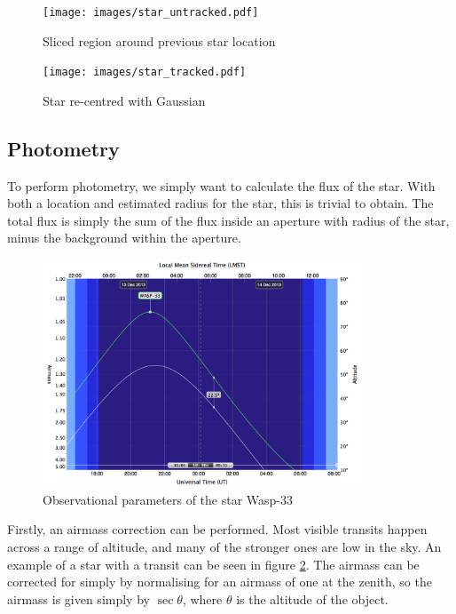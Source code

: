 \begin{figure}[ht]
    \centering
    \begin{minipage}[b]{\figwidth}
        \centering
        \texttt{[image: images/star\_untracked.pdf]}
        \caption{Sliced region around previous star location}
        \label{fig:untracked_star}
    \end{minipage}\quad\quad
    \begin{minipage}[b]{\figwidth}
        \texttt{[image: images/star\_tracked.pdf]}
        \caption{Star re-centred with Gaussian}
        \label{fig:tracked_Star}
    \end{minipage}
\end{figure}
\subsection{Photometry}

To perform photometry, we simply want to calculate the flux of the star. With both a location and estimated radius for the star, this is trivial to obtain. The total flux is simply the sum of the flux inside an aperture with radius of the star, minus the background within the aperture.

\begin{figure}[ht]
    \centering
    \includegraphics[width=0.85\textwidth]{images/airmass.png}
    \caption{Observational parameters of the star Wasp-33}
    \label{fig:airmass}
\end{figure}

Firstly, an airmass correction can be performed. Most visible transits happen across a range of altitude, and many of the stronger ones are low in the sky. An example of a star with a transit can be seen in figure \ref{fig:airmass}. The airmass can be corrected for simply by normalising for an airmass of one at the zenith, so the airmass is given simply by $\sec \theta$, where $\theta$ is the altitude of the object.

